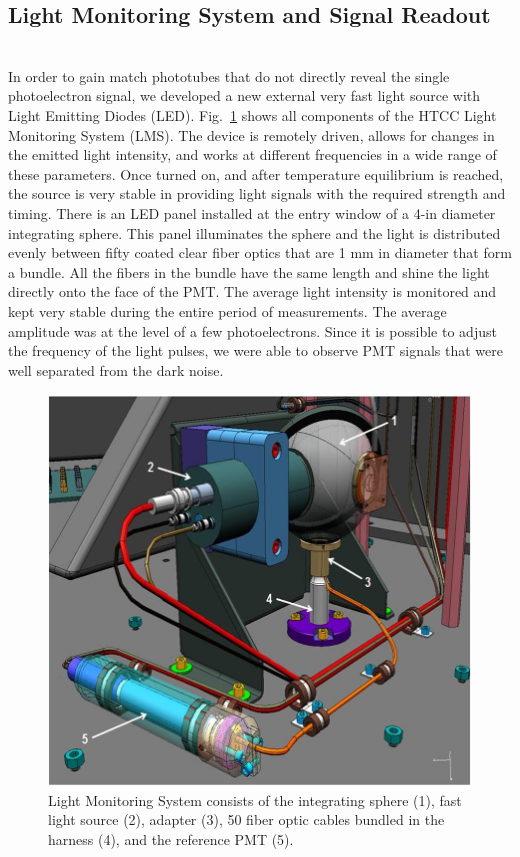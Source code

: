 \subsection{Light Monitoring System and Signal Readout}
\indent
 \\
 \indent In order to gain match phototubes that do not directly reveal the single photoelectron signal, we developed a new external very fast light source with Light Emitting Diodes (LED). Fig.~\ref{fig:LMS_Picture_3} shows all components of the HTCC Light Monitoring System (LMS). The device is remotely driven, allows for changes in the emitted light intensity, and works at different frequencies in a wide range of these parameters. Once turned on, and after temperature equilibrium is reached, the source is very stable in providing light signals with the required strength and timing. There is an LED panel installed at the entry window of a 4-in diameter integrating sphere. This panel illuminates the sphere and the light is distributed evenly between fifty coated clear fiber optics that are 1 mm in diameter that form a bundle. All the fibers in the bundle have the same length and shine the light directly onto the face of the PMT. The average light intensity is monitored and kept very stable during the entire period of measurements. The average amplitude was at the level of a few photoelectrons. Since it is possible to adjust the frequency of the light pulses, we were able to observe PMT signals that were well separated from the dark noise.
 
\begin{figure}[!ht]
    \centering
    \includegraphics[width=1.0\linewidth,trim={0.0cm 0.0cm 0.0cm 0.0cm},clip]{images/LMS_Picture_3.jpg}
    \caption{Light Monitoring System consists of the integrating sphere (1), fast light source (2), adapter (3), 50 fiber optic cables bundled in the harness (4), and the reference PMT (5).}
    \label{fig:LMS_Picture_3}
\end{figure} 
 
